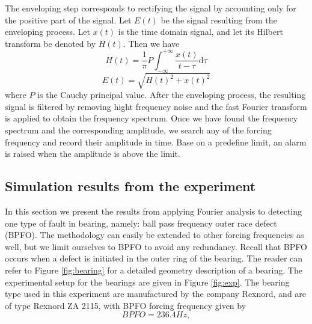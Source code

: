 \documentclass[../Main/thesis.tex]{subfiles}
\begin{document}
\justify
The enveloping step corresponds to rectifying the signal by accounting only for the positive part of the signal. Let $E(t)$ be the signal resulting from the enveloping process. Let $x(t)$ is the time domain signal, and let its Hilbert transform be denoted by $H(t)$. Then we have
\begin{equation}
H(t) = \frac{1}{\pi}P\int_{-\infty}^{+\infty}\frac{x(t)}{t-\tau}\mathrm{d}\tau
\end{equation}
\begin{equation}
E(t) = \sqrt{H(t)^{2}+ x(t)^{2}}
\end{equation}
where $P$ is the Cauchy principal value. After the enveloping process, the resulting signal is filtered by removing hight frequency noise and the fast Fourier transform is applied to obtain the frequency spectrum.
\justify
Once we have found the frequency spectrum and the corresponding amplitude, we search any of the forcing frequency and record their amplitude in time. Base on a predefine limit, an alarm is raised when the amplitude is above the limit.
\clearpage
\subsection{Simulation results from the experiment}
In this section we present the results from applying Fourier analysis to detecting one type of fault in bearing, namely: ball pass frequency outer race defect (BPFO). The methodology can easily be extended to other forcing frequencies as well, but we limit ourselves to BPFO to avoid any redundancy. Recall that BPFO occurs when a defect is initiated in the outer ring of the bearing. The reader can refer to Figure \ref{fig:bearing} for a detailed geometry description of a bearing. The experimental setup for the bearings are given in Figure \ref{fig:exp}. The bearing type used in this experiment are manufactured by the company Rexnord, and are of type Rexnord ZA 2115, with BPFO forcing frequency  given by 
\begin{equation}
BPFO = 236.4 Hz, %
\end{equation}
\end{document}
